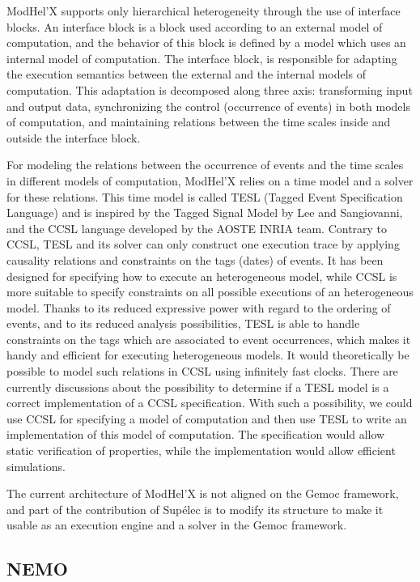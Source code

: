 \documentclass{gemoc} %
\begin{document}
ModHel'X supports only hierarchical heterogeneity through the use of interface blocks. An interface block is a block used according to an external model of computation, and the behavior of this block is defined by a model which uses an internal model of computation. The interface block, is responsible for adapting the execution semantics between the external and the internal models of computation. This adaptation is decomposed along three axis: transforming input and output data, synchronizing the control (occurrence of events) in both models of computation, and maintaining relations between the time scales inside and outside the interface block.

For modeling the relations between the occurrence of events and the time scales in different models of computation, ModHel'X relies on a time model and a solver for these relations. This time model is called TESL (Tagged Event Specification Language) and is inspired by the Tagged Signal Model by Lee and Sangiovanni, and the CCSL language developed by the AOSTE INRIA team. Contrary to CCSL, TESL and its solver can only construct one execution trace by applying causality relations and constraints on the tags (dates) of events. It has been designed for specifying how to execute an heterogeneous model, while CCSL is more suitable to specify constraints on all possible executions of an heterogeneous model. Thanks to its reduced expressive power with regard to the ordering of events, and to its reduced analysis possibilities, TESL is able to handle constraints on the tags which are associated to event occurrences, which makes it handy and efficient for executing heterogeneous models. It would theoretically be possible to model such relations in CCSL using infinitely fast clocks. There are currently discussions about the possibility to determine if a TESL model is a correct implementation of a CCSL specification. With such a possibility, we could use CCSL for specifying a model of computation and then use TESL to write an implementation of this model of computation. The specification would allow static verification of properties, while the implementation would allow efficient simulations.

The current architecture of ModHel'X is not aligned on the Gemoc framework, and part of the contribution of Supélec is to modify its structure to make it usable as an execution engine and a solver in the Gemoc framework.


\subsection{NEMO}
\end{document}
